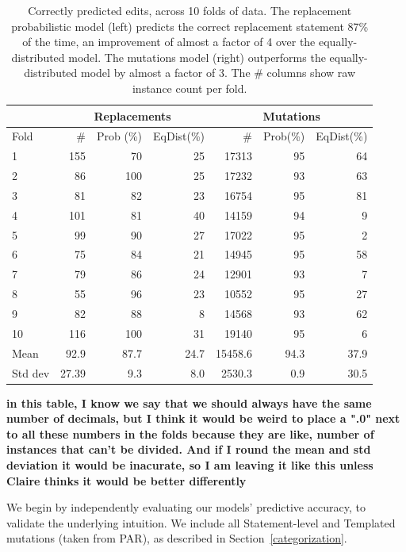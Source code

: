 \documentclass[conference]{IEEEtran}
\newcommand{\todo}[1]
  {{\scriptsize \textbf{\color{red} {#1}}}}
\begin{document}
\begin{table}[ht]
{\footnotesize
{\centering
\begin{tabular}{l|rrr|rrr}
\toprule
   &\multicolumn{3}{c|}{Replacements} &\multicolumn{3}{c}{Mutations} \\
\midrule
Fold	& \# &Prob (\%)& EqDist(\%)& \# &Prob(\%)& EqDist(\%) \\
\midrule
1	& 155&70&	25 &17313&  95 & 64   \\
2	& 86&100&	25  & 17232& 93 & 63   \\
3	& 81&82	&23  & 16754& 95 & 81 \\
4	& 101&81	&40  & 14159& 94 & 9   \\
5	& 99&90	&27  & 17022& 95 & 2  \\
6	& 75&84	&21  & 14945& 95& 58  \\
7	& 79&86	&24  & 12901& 93& 7  \\
8	& 55&96	&23  & 10552& 95& 27  \\
9	& 82&88	&8  & 14568& 93& 62 \\
10	& 116&100	&31 & 19140 & 95 & 6 \\
\midrule
Mean	& 92.9 &87.7	&24.7& 15458.6  & 94.3 & 37.9  \\
\midrule
Std dev	& 27.39&9.3&	8.0 & 2530.3 & 0.9 & 30.5   \\
\bottomrule
\end{tabular}
\center
  \caption{Correctly predicted edits, across 10 folds of data.
The replacement probabilistic model (left) predicts
    the correct replacement statement 87\% of the time,
    an improvement of almost a factor of 4 over the equally-distributed model. 
    The mutations model (right) outperforms the equally-distributed model by 
    almost a factor of 3. The \# columns show raw instance count per fold. \label{results10fcv}} 
}}
\end{table} 
\todo{in this table, I know we say that we should always have the same number of decimals, but I think it would be weird to place a ".0" next to all these numbers in the folds because they are like, number of instances that can't be divided. And if I round the mean and std deviation it would be inacurate, so I am leaving it like this unless Claire thinks it would be better differently}

We begin by independently evaluating our models' predictive accuracy, to
validate the underlying intuition.  We include all Statement-level and Templated
mutations (taken from PAR), as described in Section~\ref{categorization}.
\end{document}
